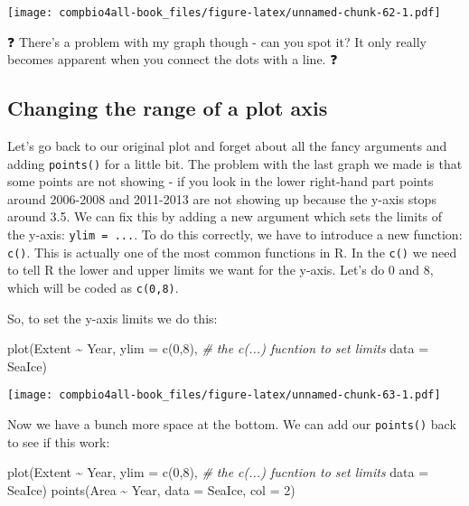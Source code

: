 \documentclass[
]{book}
\newenvironment{Shaded}{\begin{snugshade}}{\end{snugshade}}
\newcommand{\AttributeTok}[1]{\textcolor[rgb]{0.77,0.63,0.00}{#1}}
\newcommand{\CommentTok}[1]{\textcolor[rgb]{0.56,0.35,0.01}{\textit{#1}}}
\newcommand{\DecValTok}[1]{\textcolor[rgb]{0.00,0.00,0.81}{#1}}
\newcommand{\FunctionTok}[1]{\textcolor[rgb]{0.00,0.00,0.00}{#1}}
\newcommand{\NormalTok}[1]{#1}
\newcommand{\SpecialCharTok}[1]{\textcolor[rgb]{0.00,0.00,0.00}{#1}}
\begin{document}
\texttt{[image: compbio4all-book\_files/figure-latex/unnamed-chunk-62-1.pdf]}

❓ There's a problem with my graph though - can you spot it? It only really becomes apparent when you connect the dots with a line. ❓

\hypertarget{changing-the-range-of-a-plot-axis}{%
\subsection{Changing the range of a plot axis}\label{changing-the-range-of-a-plot-axis}}

Let's go back to our original plot and forget about all the fancy arguments and adding \texttt{points()} for a little bit. The problem with the last graph we made is that some points are not showing - if you look in the lower right-hand part points around 2006-2008 and 2011-2013 are not showing up because the y-axis stops around 3.5. We can fix this by adding a new argument which sets the limits of the y-axis: \texttt{ylim\ =\ ...}. To do this correctly, we have to introduce a new function: \texttt{c()}. This is actually one of the most common functions in R. In the \texttt{c()} we need to tell R the lower and upper limits we want for the y-axis. Let's do 0 and 8, which will be coded as \texttt{c(0,8)}.

So, to set the y-axis limits we do this:

\begin{Shaded}
\begin{Highlighting}[]
\FunctionTok{plot}\NormalTok{(Extent }\SpecialCharTok{\textasciitilde{}}\NormalTok{ Year,  }
     \AttributeTok{ylim =} \FunctionTok{c}\NormalTok{(}\DecValTok{0}\NormalTok{,}\DecValTok{8}\NormalTok{), }\CommentTok{\# the c(...) fucntion to set limits}
     \AttributeTok{data =}\NormalTok{ SeaIce) }
\end{Highlighting}
\end{Shaded}

\texttt{[image: compbio4all-book\_files/figure-latex/unnamed-chunk-63-1.pdf]}

Now we have a bunch more space at the bottom. We can add our \texttt{points()} back to see if this work:

\begin{Shaded}
\begin{Highlighting}[]
\FunctionTok{plot}\NormalTok{(Extent }\SpecialCharTok{\textasciitilde{}}\NormalTok{ Year,  }
     \AttributeTok{ylim =} \FunctionTok{c}\NormalTok{(}\DecValTok{0}\NormalTok{,}\DecValTok{8}\NormalTok{), }\CommentTok{\# the c(...) fucntion to set limits}
     \AttributeTok{data =}\NormalTok{ SeaIce) }
\FunctionTok{points}\NormalTok{(Area }\SpecialCharTok{\textasciitilde{}}\NormalTok{ Year,}
      \AttributeTok{data =}\NormalTok{ SeaIce,}
      \AttributeTok{col =} \DecValTok{2}\NormalTok{)}
\end{Highlighting}
\end{Shaded}
\end{document}

